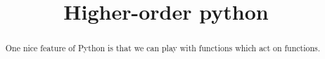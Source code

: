 \documentclass{ximera}
\title{Higher-order python}
\begin{document}
\begin{abstract}
  One nice feature of Python is that we can play with functions which act on functions.
\end{abstract}






	

	





	

	
\end{document}
